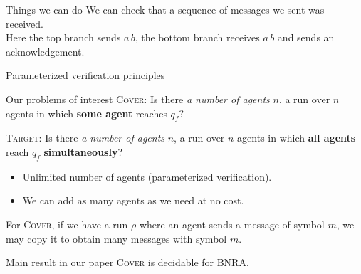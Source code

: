 \documentclass{beamer}
\newcommand{\COVER}{\textsc{Cover}\xspace}
\newcommand{\TARGET}{\textsc{Target}\xspace}
\begin{document}
\begin{frame}{Things we can do}
	We can check that a sequence of messages we sent was received. \\
	Here the top branch sends $a \, b$, the bottom branch receives $a \, b$ and sends an acknowledgement. 
	\vspace{0.5cm}

		\centering
		
\end{frame}

\begin{frame}{Parameterized verification principles}
	
	\begin{block}{Our problems of interest}
		{\COVER}: Is there \emph{a number of agents} $n$, a run over $n$ agents in which \textbf{some agent} reaches $q_f$?
		\vspace{0.3cm}

		{\TARGET}: Is there \emph{a number of agents} $n$, a run over $n$ agents in which \textbf{all agents} reach $q_f$ \textbf{simultaneously}?
	\end{block}
	
	\pause

	\begin{itemize}
		\item Unlimited number of agents (parameterized verification).
		
		\item We can add as many agents as we need at no cost. 
	\end{itemize}
	
	\pause

	For \COVER, if we have a run $\rho$ where an agent sends a message of symbol $m$, we may copy it to obtain many messages with symbol $m$. 
	
	\pause 

	\begin{block}{Main result in our paper}
		{\COVER} is decidable for BNRA.
	\end{block}
	
\end{frame}
\end{document}
